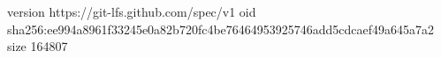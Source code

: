 version https://git-lfs.github.com/spec/v1
oid sha256:ee994a8961f33245e0a82b720fc4be76464953925746add5cdcaef49a645a7a2
size 164807
